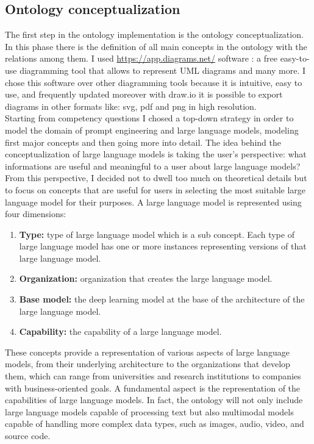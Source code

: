 \subsection{Ontology conceptualization}
The first step in the ontology implementation is the ontology conceptualization. In this phase there is the definition of all main concepts in the ontology with the relations among them. I used \href{draw.io}{https://app.diagrams.net/} software : a free easy-to-use diagramming tool that allows to represent UML diagrams and many more. I chose this software over other diagramming tools because it is intuitive, easy to use, and frequently updated moreover with draw.io it is possible to export diagrams in other formats like: svg, pdf and png in high resolution.\\
Starting from competency questions I chosed a top-down strategy in order to model the domain of prompt engineering and large language models, modeling first major concepts and then going more into detail. The idea behind the conceptualization of large language models is  taking the user's perspective: what informations are useful and meaningful to a user about large language models? From this perspective, I decided not to dwell too much on theoretical details but to focus on concepts that are useful for users in selecting the most suitable large language model for their purposes. A large language model is represented using four dimensions:
\begin{enumerate}
    \item \textbf{Type:} type of large language model which is a sub concept. Each type of large language model has one or more instances representing versions of that large language model.

    \item \textbf{Organization:} organization that creates the large language model.

    \item \textbf{Base model:} the deep learning model at the base of the architecture of the large language model.

    \item \textbf{Capability:} the capability of a large language model.
\end{enumerate}
These concepts provide a representation of various aspects of large language models, from their underlying architecture to the organizations that develop them, which can range from universities and research institutions to companies with business-oriented goals. A fundamental aspect is the representation of the capabilities of large language models. In fact, the ontology will not only include large language models capable of processing text but also multimodal models capable of handling more complex data types, such as images, audio, video, and source code.\\
